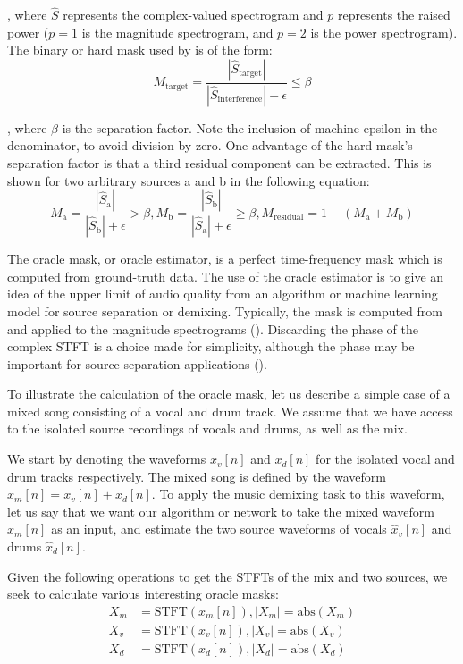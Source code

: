 \documentclass[report.tex]{subfiles}
\begin{document}
, where $\hat{S}$ represents the complex-valued spectrogram and $p$ represents the raised power ($p = 1$ is the magnitude spectrogram, and $p = 2$ is the power spectrogram). The binary or hard mask used by \textcite{driedger} is of the form:
\[ M_{\text{target}} = \frac{|\hat{S}_{\text{target}}|}{|\hat{S}_{\text{interference}}| + \epsilon} \le \beta \]

, where $\beta$ is the separation factor. Note the inclusion of machine epsilon in the denominator, to avoid division by zero. One advantage of the hard mask's separation factor is that a third residual component can be extracted. This is shown for two arbitrary sources a and b in the following equation:
\[ M_{\text{a}} = \frac{|\hat{S}_{\text{a}}|}{|\hat{S}_{\text{b}}| + \epsilon} > \beta, M_{\text{b}} = \frac{|\hat{S}_{\text{b}}|}{|\hat{S}_{\text{a}}| + \epsilon} \ge \beta, M_{\text{residual}} = 1 - (M_{\text{a}} + M_{\text{b}}) \]

The oracle mask, or oracle estimator, is a perfect time-frequency mask which is computed from ground-truth data. The use of the oracle estimator is to give an idea of the upper limit of audio quality from an algorithm or machine learning model for source separation or demixing. Typically, the mask is computed from and applied to the magnitude spectrograms (\cite{fitzgerald1, fitzgerald2, driedger, umx, plumbley1, plumbley2}). Discarding the phase of the complex STFT is a choice made for simplicity, although the phase may be important for source separation applications (\cite{ditchphase}).

To illustrate the calculation of the oracle mask, let us describe a simple case of a mixed song consisting of a vocal and drum track. We assume that we have access to the isolated source recordings of vocals and drums, as well as the mix.

We start by denoting the waveforms $x_{v}[n]$ and $x_{d}[n]$ for the isolated vocal and drum tracks respectively. The mixed song is defined by the waveform $x_{m}[n] = x_{v}[n] + x_{d}[n]$. To apply the music demixing task to this waveform, let us say that we want our algorithm or network to take the mixed waveform $x_{m}[n]$ as an input, and estimate the two source waveforms of vocals $\hat{x}_{v}[n]$ and drums $\hat{x}_{d}[n]$.

Given the following operations to get the STFTs of the mix and two sources, we seek to calculate various interesting oracle masks:
\begin{align}
	\nonumber X_{m} &= \text{STFT}(x_{m}[n]), |X_{m}| = \text{abs}(X_{m})\\
	\nonumber X_{v} &= \text{STFT}(x_{v}[n]), |X_{v}| = \text{abs}(X_{v})\\
	\nonumber X_{d} &= \text{STFT}(x_{d}[n]), |X_{d}| = \text{abs}(X_{d})
\end{align}
 
\end{document}
